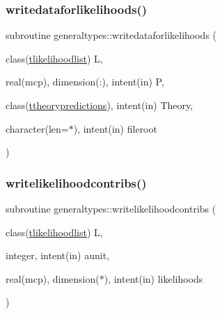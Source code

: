 \mbox{\label{namespacegeneraltypes_af94e150476d45f72d492e761a2d02ab5}} 
\subsubsection{\texorpdfstring{writedataforlikelihoods()}{writedataforlikelihoods()}}
{\footnotesize\ttfamily subroutine generaltypes\+::writedataforlikelihoods (\begin{DoxyParamCaption}\item[{class(\mbox{\hyperlink{structgeneraltypes_1_1tlikelihoodlist}{tlikelihoodlist}})}]{L,  }\item[{real(mcp), dimension(\+:), intent(in)}]{P,  }\item[{class(\mbox{\hyperlink{structgeneraltypes_1_1ttheorypredictions}{ttheorypredictions}}), intent(in)}]{Theory,  }\item[{character(len=$\ast$), intent(in)}]{fileroot }\end{DoxyParamCaption})\hspace{0.3cm}{\ttfamily [private]}}

\mbox{\label{namespacegeneraltypes_a26624f9233a06ac3e62f6bdb2ad416f8}} 
\subsubsection{\texorpdfstring{writelikelihoodcontribs()}{writelikelihoodcontribs()}}
{\footnotesize\ttfamily subroutine generaltypes\+::writelikelihoodcontribs (\begin{DoxyParamCaption}\item[{class(\mbox{\hyperlink{structgeneraltypes_1_1tlikelihoodlist}{tlikelihoodlist}})}]{L,  }\item[{integer, intent(in)}]{aunit,  }\item[{real(mcp), dimension($\ast$), intent(in)}]{likelihoods }\end{DoxyParamCaption})\hspace{0.3cm}{\ttfamily [private]}}

\mbox{\label{namespacegeneraltypes_a6ae308a4d8fb255fd1e15dc6a8911931}} 
